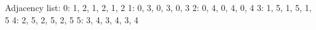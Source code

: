 \documentclass{article}
\begin{document}
Adjacency list: 
0: 1, 2, 1, 2, 1, 2
1: 0, 3, 0, 3, 0, 3
2: 0, 4, 0, 4, 0, 4
3: 1, 5, 1, 5, 1, 5
4: 2, 5, 2, 5, 2, 5
5: 3, 4, 3, 4, 3, 4
\end{document}
